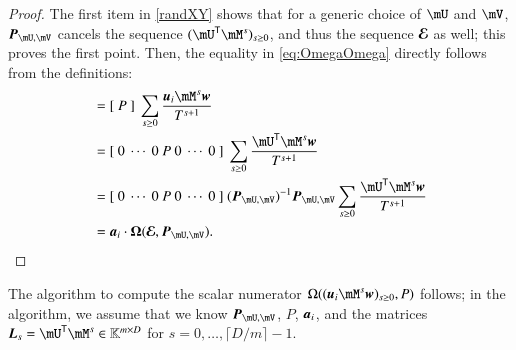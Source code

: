 \documentclass[final,1p,times,authoryear]{elsarticle}
\newcommand{\mat}[1]{\bm{\MakeUppercase{#1}}} %
\newcommand{\row}[1]{\bm{\MakeLowercase{#1}}} %
\newcommand{\col}[1]{\bm{\MakeLowercase{#1}}} %
\newcommand{\minpoly}{P}
\newcommand{\trsp}[1]{#1^{\mathsf{T}}} %
\def\K{\mathbb{K}}
\def\K {\ensuremath{\mathbb{K}}}
\newcommand{\mUt}{\trsp{\mU}}
\begin{document}
\begin{proof}
  The first item in \cref{randXY} shows that for a generic choice of
  $\mU$ and $\mV$, $\mat{P}_{\mU,\mV}$ cancels the sequence $(\mUt
  \mM^s)_{s \ge 0}$, and thus the sequence $\mat{\mathcal{E}}$ as well;
  this proves the first point. Then, the equality
  in \cref{eq:OmegaOmega} directly follows from the definitions:
  \begin{align*}
    [~ \Omega((\row{u}_i \mM^s \col{w})_{s \ge 0}, \minpoly)~]  &= [~\minpoly~]\ \sum_{s \ge 0} \frac{\row{u}_i \mM^s \col{w}}{T^{s+1}}\\
                                                                &=  [~0~\cdots~0~\minpoly~0~\cdots~0~]\  \sum_{s \ge 0} \frac{\mUt \mM^s \col{w}}{T^{s+1}}\\
                                                                &=  [~0~\cdots~0~\minpoly~0~\cdots~0~]\ (\mat{P}_{\mU,\mV})^{-1} \mat{P}_{\mU,\mV} \sum_{s \ge 0} \frac{\mUt \mM^s \col{w}}{T^{s+1}}\\
                                                                &=  \row{a}_i\cdot \mat{\Omega}(\mat{\mathcal{E}}, \mat{P}_{\mU,\mV}).
                                                                \qedhere
  \end{align*}
\end{proof}

The algorithm to compute the scalar numerator $\Omega((\row{u}_i \mM^s
\col{w})_{s \ge 0}, \minpoly)$ follows; in the algorithm, we
assume that we know $\mat{P}_{\mU,\mV}$, $P$, $\row{a}_i$, and the
matrices $\mat{L}_s=\mUt \mM^s \in \K^{m \times D}$ for
$s=0,\dots,\lceil D/m \rceil-1$.
\end{document}
